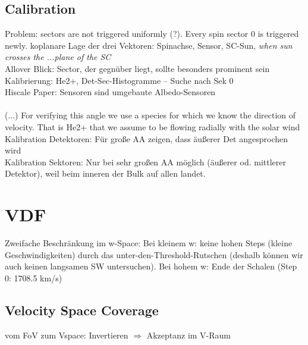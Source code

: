 %
\subsection{Calibration}
Problem: sectors are not triggered uniformly (?). Every spin sector 0 is triggered newly. koplanare Lage der drei Vektoren: Spinachse, Sensor, SC-Sun, \textit{when sun crosses the ...plane of the SC}\\
Allover Blick: Sector, der gegnüber liegt, sollte besonders prominent sein
\\
Kalibrierung: He2+, Det-Sec-Histogramme -- Suche nach Sek 0
\\ Hiscale Paper: Sensoren sind umgebaute Albedo-Sensoren
\\ \\
(...) For verifying this angle we use a species for which we know the direction of velocity. That is He2+ that we assume to be flowing radially with the solar wind
\\
Kalibration Detektoren: Für große AA zeigen, dass äußerer Det angesprochen wird
\\
Kalibration Sektoren: Nur bei sehr großen AA möglich (äußerer od. mittlerer Detektor), weil beim inneren der Bulk auf allen landet.


%
%
%
\section{VDF}
Zweifache Beschränkung im w-Space: Bei kleinem w: keine hohen Steps (kleine Geschwindigkeiten) durch das unter-den-Threshold-Rutschen (deshalb können wir auch keinen langsamen SW untersuchen). Bei hohem w: Ende der Schalen (Step 0: 1708.5 km/s)
%
\subsection{Velocity Space Coverage}
vom FoV zum Vspace: Invertieren $\Rightarrow$ Akzeptanz im V-Raum

%
